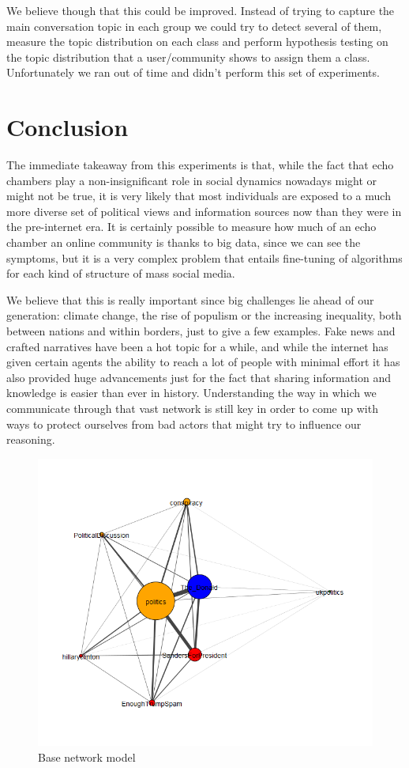 \documentclass[11pt]{article}
\begin{document}
We believe though that this could be improved. Instead of trying to capture the main conversation topic in each group we could try to detect several of them, measure the topic distribution on each class and perform hypothesis testing on the topic distribution that a user/community shows to assign them a class. Unfortunately we ran out of time and didn't perform this set of experiments.

\section{Conclusion}

The immediate takeaway from this experiments is that, while the fact that echo chambers play a non-insignificant role in social dynamics nowadays might or might not be true, it is very likely that most individuals are exposed to a much more diverse set of political views and information sources now than they were in the pre-internet era. It is certainly possible to measure how much of an echo chamber an online community is thanks to big data, since we can see the symptoms, but it is a very complex problem that entails fine-tuning of algorithms for each kind of structure of mass social media.

We believe that this is really important since big challenges lie ahead of our generation: climate change, the rise of populism or the increasing inequality, both between nations and within borders, just to give a few examples. Fake news and crafted narratives have been a hot topic for a while, and while the internet has given certain agents the ability to reach a lot of people with minimal effort it has also provided huge advancements just for the fact that sharing information and knowledge is easier than ever in history. Understanding the way in which we communicate through that vast network is still key in order to come up with ways to protect ourselves from bad actors that might try to influence our reasoning.

\begin{figure}[h]
	\includegraphics[width=\textwidth]{img/base_network.png}
	\caption{\label{base_net_big} Base network model}
\end{figure}
\end{document}
